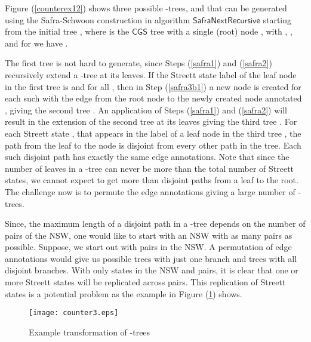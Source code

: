 \documentclass[3p]{elsarticle}
\newcommand{\CGS}{\ensuremath{\textsf{CGS }}}
\newcommand{\algo}[1]{\ensuremath{\textsf{{#1}}}}
\begin{document}
Figure (\ref{counterex12}) shows three possible -trees,  and
 that can be generated using the Safra-Schwoon construction in algorithm
\algo{SafraNextRecursive} starting from the initial tree , where  is
the \CGS tree with a single (root) node , with , ,  and for  we have .

The first tree  is not hard to generate, since Steps (\ref{safra1}) and
(\ref{safra2}) recursively extend a -tree at its leaves. If the Streett
state label of the leaf node in the first tree  is  and  for all , then in Step (\ref{safra3b1}) a
new node is created for each such  with the edge from the root node
to the newly created node annotated , giving the second tree .  An
application of Steps (\ref{safra1}) and (\ref{safra2}) will result in the
extension of the second tree  at its leaves giving the third tree .
For each Streett state ,  that appears in the label of a leaf
node in the third tree , the path from the leaf to the node is disjoint
from every other path in the tree. Each such disjoint path has exactly the same
edge annotations.  Note that since the number of leaves in a -tree can
never be more than the total number of Streett states, we cannot expect to get
more than  disjoint paths from a leaf to the root.  The challenge now is to
permute the edge annotations giving a large number of -trees.







Since, the maximum length of a disjoint path in a -tree depends on the
number of pairs of the NSW, one would like to start with an NSW with as many
pairs as possible. Suppose, we start out with  pairs in the NSW. A
permutation of  edge annotations would give us  possible trees with
just one branch and  trees with all  disjoint branches. With
only  states in the NSW and  pairs, it is clear that one or more Streett
states will be replicated across pairs.  This replication of Streett states is a
potential problem as the example in Figure (\ref{counterex3}) shows.  

\begin{figure}
\begin{center}
\texttt{[image: counter3.eps]}
\end{center}
\caption{Example transformation of -trees}
\label{counterex3}
\end{figure}
\end{document}
